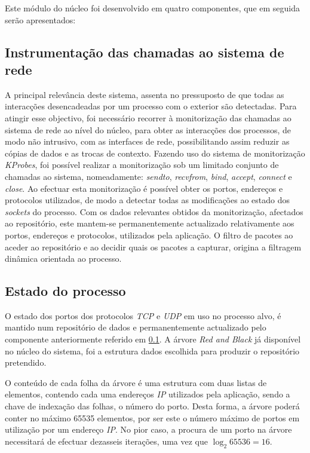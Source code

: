 Este módulo do núcleo foi desenvolvido em quatro componentes, que em seguida serão apresentados:


\subsection{Instrumentação das chamadas ao sistema de rede}
\label{sub:mon_syscalls}

A principal relevância deste sistema, assenta no pressuposto de que todas as interacções desencadeadas por um processo com o exterior são detectadas.
Para atingir esse objectivo, foi necessário recorrer à monitorização das chamadas ao sistema de rede ao nível do núcleo, para obter as interacções dos processos, de modo não intrusivo, com as interfaces de rede, possibilitando assim reduzir as cópias de dados e as trocas de contexto.
Fazendo uso do sistema de monitorização \textit{KProbes}, foi possível realizar a monitorização sob um limitado conjunto de chamadas ao sistema, nomeadamente: \textit{sendto}, \textit{recvfrom}, \textit{bind}, \textit{accept}, \textit{connect} e \textit{close}.
Ao efectuar esta monitorização é possível obter os portos, endereços e protocolos utilizados, de modo a detectar todas as modificações ao estado dos \textit{sockets} do processo.
Com os dados relevantes obtidos da monitorização, afectados ao repositório, este mantem-se permanentemente actualizado relativamente aos portos, endereços e protocolos, utilizados pela aplicação.
O filtro de pacotes ao aceder ao repositório e ao decidir quais os pacotes a capturar, origina a filtragem dinâmica orientada ao processo.


\subsection{Estado do processo}
\label{sub:data_repository}

O estado dos portos dos protocolos \textit{TCP} e \textit{UDP} em uso no processo alvo, é mantido num repositório de dados e permanentemente actualizado pelo componente anteriormente referido em \ref{sub:mon_syscalls}.
A árvore \textit{Red and Black} já disponível no núcleo do sistema, foi a estrutura dados escolhida para produzir o repositório pretendido.

O conteúdo de cada folha da árvore é uma estrutura com duas listas de elementos, contendo cada uma endereços \textit{IP} utilizados pela aplicação, sendo a chave de indexação das folhas, o número do porto.
Desta forma, a árvore poderá conter no máximo 65535 elementos, por ser este o número máximo de portos em utilização por um endereço \textit{IP}.
No pior caso, a procura de um porto na árvore necessitará de efectuar dezasseis iterações, uma vez que \begin{math}\log _2 65536 = 16 \end{math}.

